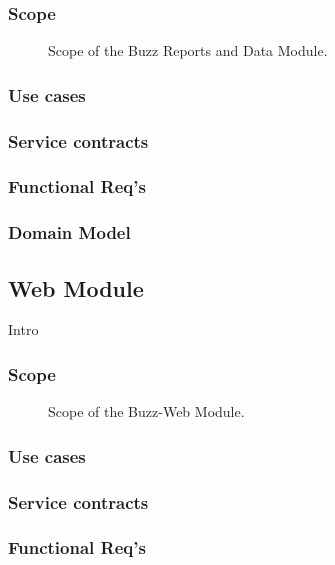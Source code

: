 \documentclass[12pt]{article}
\begin{document}
\subsubsection{Scope}
\par{}

\begin{figure}[h]
\iffalse\texttt{[image: Diagrams/scopeRaD.jpeg]}\fi
\caption{Scope of the Buzz Reports and Data Module.}
\label{Use-case: Buzz-Reports and Data}
\end{figure}

\subsubsection{Use cases}
\subsubsection{Service contracts}
\subsubsection{Functional Req's}
\subsubsection{Domain Model}

\subsection{Web Module}
\par{Intro}
\subsubsection{Scope}
\par{}

\begin{figure}[h]
\iffalse\texttt{[image: Diagrams/scopeWeb.jpeg]}\fi
\caption{Scope of the Buzz-Web Module.}
\label{Use-case: Buzz-Web}
\end{figure}

\subsubsection{Use cases}
\subsubsection{Service contracts}
\subsubsection{Functional Req's}
\end{document}
